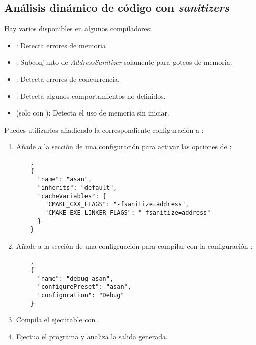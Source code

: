\subsection{Análisis dinámico de código con \emph{sanitizers}}

Hay varios  disponibles en algunos compiladores:

\begin{itemize}
  \item {}: 
        Detecta errores de memoria
  \item {}: 
        Subconjunto de \emph{AddressSanitizer} solamente para goteos de memoria.
  \item {}: 
        Detecta errores de concurrencia.
  \item {}: 
        Detecta algunos comportamientos no definidos.
  \item {} (solo con ): 
        Detecta el uso de memoria sin iniciar.
\end{itemize}

Puedes utilizarlos añadiendo la correspondiente configuración a
:

\begin{enumerate}

\item Añade a la sección de  una configuración para
activar las opciones de :

\begin{lstlisting}
    ,
    {
      "name": "asan",
      "inherits": "default",
      "cacheVariables": {
        "CMAKE_CXX_FLAGS": "-fsanitize=address",
        "CMAKE_EXE_LINKER_FLAGS": "-fsanitize=address"
      }
    }
\end{lstlisting}

\item Añade a la sección de  una configruación para
compilar con la configuración :

\begin{lstlisting}
    ,
    {
      "name": "debug-asan",
      "configurePreset": "asan",
      "configuration": "Debug"
    }
\end{lstlisting}

\item
Compila el ejecutable con .

\item
Ejectua el programa y analiza la salida generada.

\end{enumerate}
